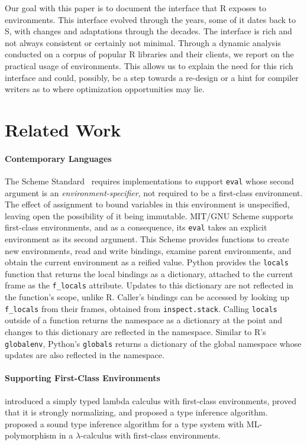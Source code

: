 \documentclass[10pt,review,sigplan,anonymous=true,authorversion=true,nonacm=true]{acmart}
\newcommand{\code}[1]{\lstinline |#1|\xspace}
\begin{document}
Our goal with this paper is to document the interface that R exposes to
environments. This interface evolved through the years, some of it dates back to
S, with changes and adaptations through the decades. The interface is rich and
not always consistent or certainly not minimal. Through a dynamic analysis
conducted on a corpus of popular R libraries and their clients, we report on the
practical usage of environments. This allows us to explain the need for this
rich interface and could, possibly, be a step towards a re-design or a hint for
compiler writers as to where optimization opportunities may lie.

\section{Related Work}

\paragraph{Contemporary Languages} The Scheme Standard~\cite{SchemeR5RS}
requires implementations to support \code{eval} whose second argument is an
\emph{environment-specifier}, not required to be a first-class environment. The
effect of assignment to bound variables in this environment is unspecified,
leaving open the possibility of it being immutable. MIT/GNU Scheme supports
first-class environments, and as a consequence, its \code{eval} takes an
explicit environment as its second argument. This Scheme provides functions to
create new environments, read and write bindings, examine parent environments,
and obtain the current environment as a reified value. Python provides the
\code{locals} function that returns the local bindings as a dictionary, attached
to the current frame as the \code{f_locals} attribute. Updates to this
dictionary are not reflected in the function's scope, unlike R. Caller's
bindings can be accessed by looking up \code{f_locals} from their frames,
obtained from \code{inspect.stack}. Calling \code{locals} outside of a function
returns the namespace as a dictionary at the point and changes to this
dictionary are reflected in the namespace. Similar to R's \code{globalenv},
Python's \code{globals} returns a dictionary of the global namespace whose
updates are also reflected in the namespace.

\paragraph{Supporting First-Class Environments} \citet{NishizakiSTLC94}
introduced a simply typed lambda calculus with first-class environments, proved
that it is strongly normalizing, and proposed a type inference algorithm.
\citet{NishizakiML94} proposed a sound type inference algorithm for a type
system with ML-polymorphism in a $\lambda$-calculus with first-class
environments.
\end{document}
